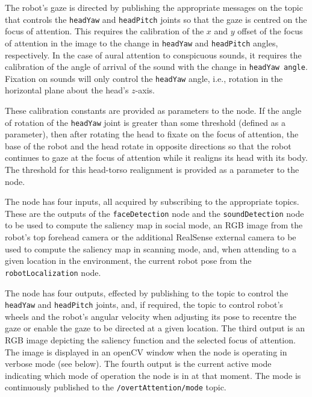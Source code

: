\documentclass{CSSRforAfrica}
\begin{document}
{{The robot's gaze is directed by publishing the appropriate  messages on the topic that controls the {\small \verb+headYaw+} and {\small \verb+headPitch+} joints so that the gaze is centred on the focus of attention.  This requires the calibration of the $x$ and $y$ offset of the focus of attention in the image to the change in {\small \verb+headYaw+} and {\small \verb+headPitch+} angles, respectively.  In the case of aural attention to conspicuous sounds, it requires the calibration of the angle of arrival  of the sound with the change in {\small \verb+headYaw angle+}.  Fixation on sounds will only control the {\small \verb+headYaw+} angle, i.e., rotation in the horizontal plane about the head's $z$-axis.  

These calibration constants are  provided as parameters to the node.  If the angle of rotation of the {\small \verb+headYaw+}  joint is greater than some threshold (defined as a parameter), then after rotating the head to fixate on the focus of attention, the base of the robot and the head  rotate in opposite directions so that the robot continues to gaze at the focus of attention while it realigns its head with its body.  The threshold for this head-torso realignment is provided as a parameter to the node.

The node has four inputs, all acquired by subscribing to the appropriate topics. These are the outputs of the  {\small \verb+faceDetection+} node and the {\small \verb+soundDetection+} node to be used to compute the saliency map in social mode, an RGB image from the robot's top forehead camera or the additional RealSense external camera to be used to compute the saliency map in scanning mode, and, when attending to a given location in the environment,  the current robot pose from the {\small \verb+robotLocalization+} node.
 
The node has four outputs, effected by publishing to the topic to control the {\small \verb+headYaw+} and {\small \verb+headPitch+} joints, and, if required, the topic to control robot's wheels and the robot's angular velocity when adjusting its pose to recentre the  gaze or enable the gaze to be directed at a given location. The third output is an RGB image depicting the saliency function and the selected focus of attention.  
The image is displayed in an openCV window when the node is operating in verbose mode (see below). The fourth output is the current active mode indicating which mode of operation the node is in at that moment. The mode is continuously published to the {\small \verb+/overtAttention/mode+} topic.

}}
\end{document}
